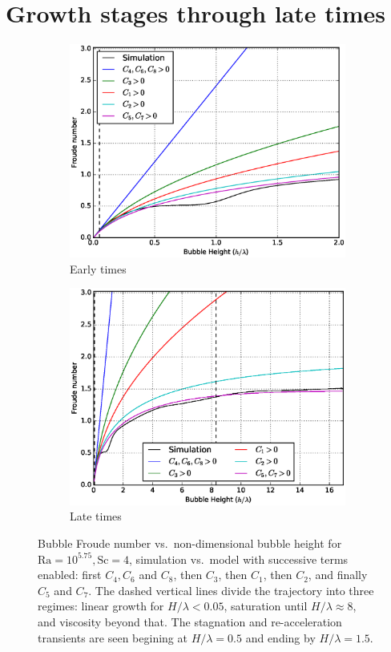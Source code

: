 \section{Growth stages through late times} 

\begin{figure}
\begin{subfigure}[c]{0.5\textwidth}
\includegraphics[width=\textwidth]{figs/Cascade-short-4-1}
\caption{Early times}
\end{subfigure}
\begin{subfigure}[c]{0.5\textwidth}
\includegraphics[width=\textwidth]{figs/Cascade-4-1}
\caption{Late times}
\end{subfigure}
\caption{ 
Bubble Froude number vs.\ non-dimensional bubble height for $\text{Ra} = 10^{5.75}, \text{Sc} = 4$, simulation vs.\ model with successive terms enabled: first $C_4, C_6$ and $C_8$, then $C_3$, then $C_1$, then $C_2$, and finally $C_5$ and $C_7$.
The dashed vertical lines divide the trajectory into three regimes: linear growth for $H/\lambda < 0.05$, saturation until $H / \lambda \approx 8$, and viscosity beyond that.
The stagnation and re-acceleration transients are seen begining at $H/\lambda = 0.5$ and ending by $H / \lambda = 1.5$.
}
\end{figure}

